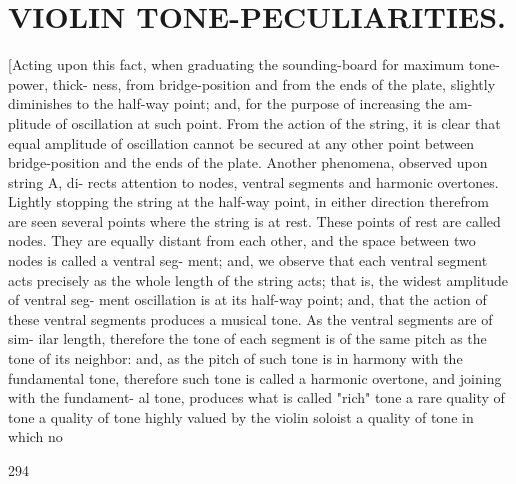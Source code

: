 \documentclass{article}
\begin{document}
\section*{VIOLIN TONE-PECULIARITIES.}
[Acting upon this fact, when graduating the sounding-board for maximum tone-power, thick- ness, from bridge-position and from the ends of the plate, slightly diminishes to the half-way point; and, for the purpose of increasing the am- plitude of oscillation at such point. From the action of the string, it is clear that equal amplitude of oscillation cannot be secured at any other point between bridge-position and the ends of the plate. Another phenomena, observed upon string A, di- rects attention to nodes, ventral segments and harmonic overtones. Lightly stopping the string at the half-way point, in either direction therefrom are seen several points where the string is at rest. These points of rest are called nodes. They are equally distant from each other, and the space between two nodes is called a ventral seg- ment; and, we observe that each ventral segment acts precisely as the whole length of the string acts; that is, the widest amplitude of ventral seg- ment oscillation is at its half-way point; and, that the action of these ventral segments produces a musical tone. As the ventral segments are of sim- ilar length, therefore the tone of each segment is of the same pitch as the tone of its neighbor: and, as the pitch of such tone is in harmony with the fundamental tone, therefore such tone is called a harmonic overtone, and joining with the fundament- al tone, produces what is called "rich" tone a rare quality of tone a quality of tone highly valued by the violin soloist a quality of tone in which no

294
\end{document}
